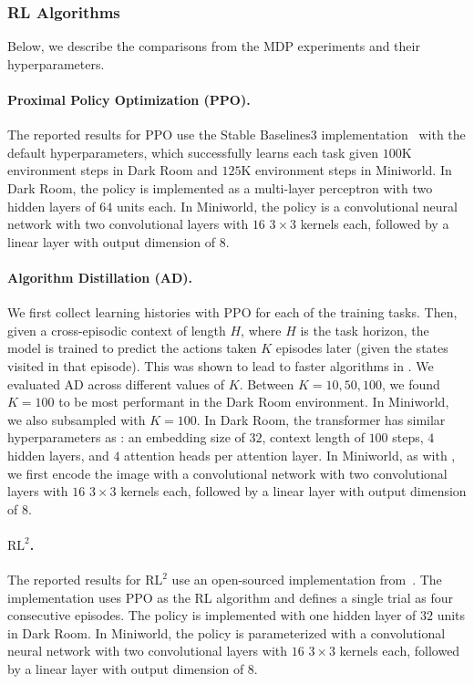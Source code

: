 \subsubsection{RL Algorithms}

Below, we describe the comparisons from the MDP experiments and their hyperparameters.

\paragraph{Proximal Policy Optimization (PPO).} The reported results for PPO use the Stable Baselines3 implementation~\citep{raffin2021stable} with the default hyperparameters, which successfully learns each task given $100$K environment steps in Dark Room and $125$K environment steps in Miniworld. In Dark Room, the policy is implemented as a multi-layer perceptron with two hidden layers of $64$ units each. In Miniworld, the policy is a convolutional neural network with two convolutional layers with $16$ $3 \times 3$ kernels each, followed by a linear layer with output dimension of $8$. 

\paragraph{Algorithm Distillation (AD).} We first collect learning histories with PPO for each of the training tasks. Then, given a cross-episodic context of length $H$, where $H$ is the task horizon, the model is trained to predict the actions taken $K$ episodes later (given the states visited in that episode). This was shown to lead to faster algorithms in \citep{laskin2022context}. We evaluated AD across different values of $K$. Between $K = 10, 50, 100$, we found $K = 100$ to be most performant in the Dark Room environment. In Miniworld, we also subsampled with $K = 100$. In Dark Room, the transformer has similar hyperparameters as \macroName{}: an embedding size of $32$, context length of $100$ steps, $4$ hidden layers, and $4$ attention heads per attention layer. In Miniworld, as with \macroName{}, we first encode the image with a convolutional network with two convolutional layers with $16$ $3 \times 3$ kernels each, followed by a linear layer with output dimension of $8$.

\paragraph{$\text{RL}^2$.} The reported results for $\text{RL}^2$ use an open-sourced implementation from~\citep{zintgraf2020varibad}. The implementation uses PPO as the RL algorithm and defines a single trial as four consecutive episodes. The policy is implemented with one hidden layer of $32$ units in Dark Room. In Miniworld, the policy is parameterized with a convolutional neural network with two convolutional layers with $16$ $3 \times 3$ kernels each, followed by a linear layer with output dimension of $8$.

